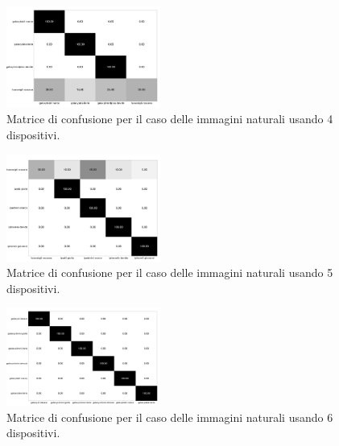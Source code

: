 \begin{figure}[h]
\begin{center}
\includegraphics[width=0.45\textwidth]{images/confusionmatrix_nat_4.png}
\end{center}
  \caption{Matrice di confusione per il caso delle immagini naturali usando 4 dispositivi.}
\label{fig:validation}
\end{figure}

\begin{figure}[h]
\begin{center}
\includegraphics[width=0.45\textwidth]{images/confusionmatrix_nat_5.png}
\end{center}
  \caption{Matrice di confusione per il caso delle immagini naturali usando 5 dispositivi.}
\label{fig:validation}
\end{figure}

\begin{figure}[h]
\begin{center}
\includegraphics[width=0.45\textwidth]{images/confusionmatrix_nat_6.png}
\end{center}
  \caption{Matrice di confusione per il caso delle immagini naturali usando 6 dispositivi.}
\label{fig:validation}
\end{figure}

